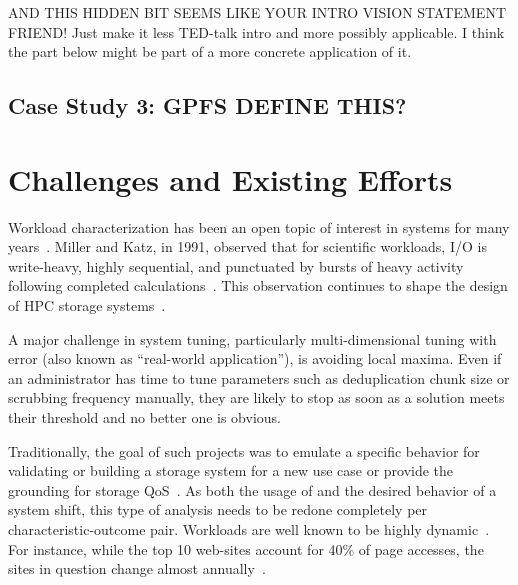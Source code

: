 AND THIS HIDDEN BIT SEEMS LIKE YOUR INTRO VISION STATEMENT FRIEND! Just make it less TED-talk intro and more possibly applicable. I think the part below might be part of a more concrete application of it. 
%
%
\subsection{Case Study 3: GPFS DEFINE THIS?}

\section{Challenges and Existing Efforts}%
\label{sec:challenges}

Workload characterization has been an open topic of interest in systems for many
years~\cite{ganger1995generating,wang2004storage,tarasov2012extracting}.  Miller
and Katz, in 1991, observed that for scientific workloads, I/O is write-heavy,
highly sequential, and punctuated by bursts of heavy activity following
completed calculations~\cite{millersc91,gunaskaramcaches11,rothpdsw07}.  This
observation continues to shape the design of HPC storage
systems~\cite{gunaskaramcaches11}.

A major challenge in system tuning, particularly multi-dimensional tuning with
error (also known as ``real-world application''), is avoiding local maxima.
Even if an administrator has time to tune parameters such as deduplication chunk
size or scrubbing frequency manually, they are likely to stop as soon as a
solution meets their threshold and no better one is obvious.%

Traditionally, the goal of such
projects was to emulate a specific behavior for validating or building a
storage system for a new use case or provide the grounding for storage
QoS~\cite{mesnier05}.  As both the usage of and the desired behavior of a system
shift, this type of analysis needs to be redone completely per
characteristic-outcome pair.  Workloads are well known to be highly
dynamic~\cite{uttamchandani2005chameleon}.  For instance, while the top 10 web-sites account for
40\% of page accesses, the sites in question change almost
annually~\cite{avani-systor}.


